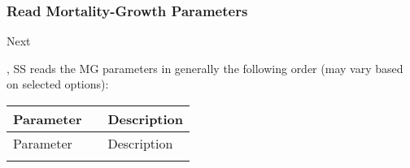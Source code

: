 \subsubsection{Read Mortality-Growth Parameters}
\hypertarget{MGorder}{Next}, SS reads the MG parameters in generally the following order (may vary based on selected options):

\begin{center}
	\begin{longtable}{p{1cm} p{2.5cm} p{10cm}}

		Parameter& & Description\\
		\hline
		\endfirsthead

		Parameter& & Description\\
		\hline
		\endhead

		\endfoot

		\endlastfoot


\end{longtable}
\end{center}
